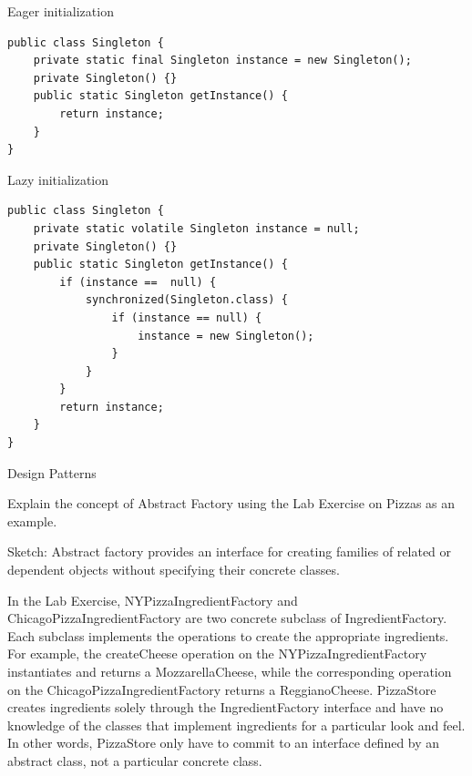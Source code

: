 \documentclass[11pt]{exam}
\begin{document}
\begin{questions}
Eager initialization
\begin{verbatim}
public class Singleton {
    private static final Singleton instance = new Singleton();
    private Singleton() {}
    public static Singleton getInstance() {
        return instance;
    }
}
\end{verbatim}

Lazy initialization
\begin{verbatim}
public class Singleton {
    private static volatile Singleton instance = null;
    private Singleton() {}
    public static Singleton getInstance() {
        if (instance ==  null) {
            synchronized(Singleton.class) {
                if (instance == null) {
                    instance = new Singleton();
                }
            }
        }
        return instance;
    }
}
\end{verbatim}

\newpage
\vfill
\question[6] Design Patterns

Explain the concept of Abstract Factory using the Lab Exercise on Pizzas as an example.


Sketch: Abstract factory provides an interface for creating families of related 
or dependent objects without specifying their concrete classes.

In the Lab Exercise, NYPizzaIngredientFactory and ChicagoPizzaIngredientFactory
are two concrete subclass of IngredientFactory. Each subclass implements the
operations to create the appropriate ingredients. For example, the
createCheese operation on the NYPizzaIngredientFactory instantiates and 
returns a MozzarellaCheese, while the corresponding operation on the
ChicagoPizzaIngredientFactory returns a ReggianoCheese. PizzaStore creates
ingredients solely through the IngredientFactory interface and have no 
knowledge of the classes that implement ingredients for a particular look and 
feel. In other words, PizzaStore only have to commit to an interface defined by 
an abstract class, not a particular concrete class.
\end{questions}
\end{document}
